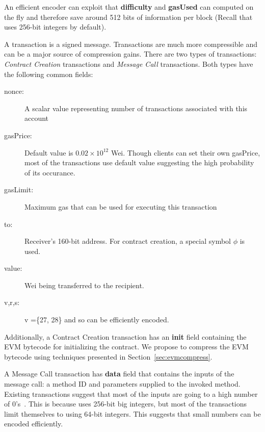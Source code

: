 An efficient encoder can exploit that \textbf{difficulty} and \textbf{gasUsed} can computed on the fly and therefore save around 512 bits of information per block (Recall that \eth{} uses 256-bit integers by default).  


A transaction is a signed message. 
Transactions are much more compressible and can be a major source of compression gains.
There are two types of transactions: {\em Contract Creation} transactions and {\em Message Call} transactions.
Both types have the following common fields:
\begin{description}
  \item[nonce:] A scalar value representing number of transactions associated with this account
  \item[gasPrice:] Default value is $0.02\times10^{12}$ Wei. Though clients can set their own gasPrice, most of the transactions use default value suggesting the high probability of its occurance.
  \item[gasLimit:] Maximum gas that can be used for executing this transaction
  \item[to:] Receiver's 160-bit address. For contract creation, a special symbol $\phi$ is used.
  \item[value:] Wei being transferred to the recipient.
  \item[v,r,s:] v =\{27, 28\} and so can be efficiently encoded.
\end{description}

Additionally, a Contract Creation transaction has an \textbf{init} field containing the EVM bytecode for initializing the contract.
We propose to compress the EVM bytecode using techniques presented in Section~\ref{sec:evmcompress}.

A Message Call transaction has \textbf{data} field that contains the inputs of the message call: a method ID and parameters supplied to the invoked method.
Existing transactions suggest that most of the inputs are going to a high number of 0's~\cite{ethtx}. 
This is because \eth{} uses 256-bit big integers, but most of the transactions limit themselves to using 64-bit integers.
This suggests that small numbers can be encoded efficiently.


%

